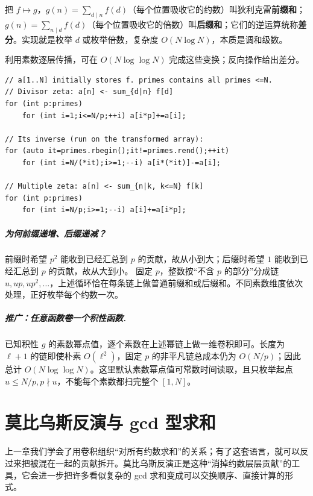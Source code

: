 \documentclass[UTF8,a4paper,11pt,twoside,openright,fontset=fandol]{ctexbook}
\theoremstyle{definition}
\begin{document}
\begin{tip}[这三个词在说什么]
把 $f\mapsto g$，$g(n)=\sum_{d\mid n}f(d)$（每个位置吸收它的约数）叫狄利克雷\textbf{前缀和}；$g(n)=\sum_{n\mid d}f(d)$（每个位置吸收它的倍数）叫\textbf{后缀和}；它们的逆运算统称\textbf{差分}。实现就是枚举 $d$ 或枚举倍数，复杂度 $O(N\log N)$，本质是调和级数。
\end{tip}

利用素数逐层传播，可在 $O(N\log\log N)$ 完成这些变换；反向操作给出差分。


\begin{lstlisting}
// a[1..N] initially stores f. primes contains all primes <=N.
// Divisor zeta: a[n] <- sum_{d|n} f[d]
for (int p:primes)
    for (int i=1;i<=N/p;++i) a[i*p]+=a[i];

// Its inverse (run on the transformed array):
for (auto it=primes.rbegin();it!=primes.rend();++it)
    for (int i=N/(*it);i>=1;--i) a[i*(*it)]-=a[i];

// Multiple zeta: a[n] <- sum_{n|k, k<=N} f[k]
for (int p:primes)
    for (int i=N/p;i>=1;--i) a[i]+=a[i*p];
\end{lstlisting}
\paragraph{为何前缀递增、后缀递减？}
前缀时希望 $p^2$ 能收到已经汇总到 $p$ 的贡献，故从小到大；后缀时希望 $1$ 能收到已经汇总到 $p$ 的贡献，故从大到小。
固定 $p$，整数按“不含 $p$ 的部分”分成链 $u,up,up^2,\ldots$，上述循环恰在每条链上做普通前缀和或后缀和。不同素数维度依次处理，正好枚举每个约数一次。

\paragraph{推广：任意函数卷一个积性函数.}
已知积性 $g$ 的素数幂点值，逐个素数在上述幂链上做一维卷积即可。长度为 $\ell+1$ 的链即使朴素 $O(\ell^2)$，固定 $p$ 的非平凡链总成本仍为 $O(N/p)$；因此总计 $O(N\log\log N)$。这里默认素数幂点值可常数时间读取，且只枚举起点 $u\le N/p,p\nmid u$，不能每个素数都扫完整个 $[1,N]$。



\chapter{莫比乌斯反演与 gcd 型求和}
\begin{chapterintro}[章节导读]
上一章我们学会了用卷积组织“对所有约数求和”的关系；有了这套语言，就可以反过来把被混在一起的贡献拆开。莫比乌斯反演正是这种“消掉约数层层贡献”的工具，它会进一步把许多看似复杂的 gcd 求和变成可以交换顺序、直接计算的形式。
\end{chapterintro}
\end{document}
